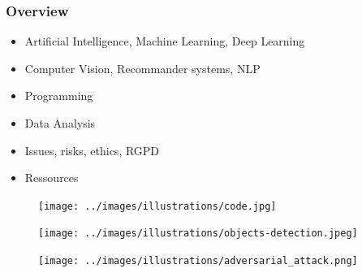 \begin{frame}\frametitle{Overview}
   \begin{minipage}{0.6\linewidth}
      \begin{itemize}
         \item Artificial Intelligence, Machine Learning, Deep Learning
         \item Computer Vision, Recommander systems, NLP
         \item Programming
         \item Data Analysis
         \item Issues, risks, ethics, RGPD
         \item Ressources
      \end{itemize}
   \end{minipage}
   \begin{minipage}{0.38\linewidth}
      \begin{figure}[H]
         \texttt{[image: ../images/illustrations/code.jpg]}
      \end{figure}
   \end{minipage}

   \vspace{.5cm}
   \begin{minipage}{0.48\linewidth}
      \begin{figure}[H]
         \texttt{[image: ../images/illustrations/objects-detection.jpeg]}
      \end{figure}
   \end{minipage}
   \begin{minipage}{0.48\linewidth}
      \begin{figure}[H]
         \texttt{[image: ../images/illustrations/adversarial\_attack.png]}
      \end{figure}
   \end{minipage}


\end{frame}


